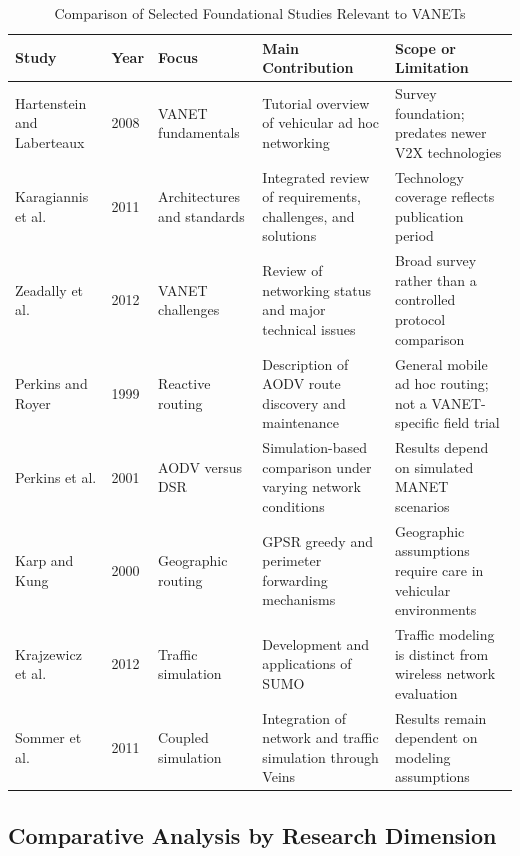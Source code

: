 \begin{table}[t]
\centering
\caption{Comparison of Selected Foundational Studies Relevant to VANETs}
\label{tab:research_comparison}
\scriptsize
\begin{tabular}{|p{2.7cm}|p{1.1cm}|p{2.8cm}|p{4.0cm}|p{4.4cm}|}
\hline
\textbf{Study} &
\textbf{Year} &
\textbf{Focus} &
\textbf{Main Contribution} &
\textbf{Scope or Limitation} \\
\hline
Hartenstein and Laberteaux
\cite{Hartenstein2008} &
2008 &
VANET fundamentals &
Tutorial overview of vehicular ad hoc networking &
Survey foundation; predates newer V2X technologies \\
\hline
Karagiannis et al.
\cite{Karagiannis2011} &
2011 &
Architectures and standards &
Integrated review of requirements, challenges, and solutions &
Technology coverage reflects publication period \\
\hline
Zeadally et al.
\cite{Zeadally2012} &
2012 &
VANET challenges &
Review of networking status and major technical issues &
Broad survey rather than a controlled protocol comparison \\
\hline
Perkins and Royer
\cite{Perkins1999} &
1999 &
Reactive routing &
Description of AODV route discovery and maintenance &
General mobile ad hoc routing; not a VANET-specific field trial \\
\hline
Perkins et al.
\cite{Perkins2001} &
2001 &
AODV versus DSR &
Simulation-based comparison under varying network conditions &
Results depend on simulated MANET scenarios \\
\hline
Karp and Kung
\cite{Karp2000} &
2000 &
Geographic routing &
GPSR greedy and perimeter forwarding mechanisms &
Geographic assumptions require care in vehicular environments \\
\hline
Krajzewicz et al.
\cite{Krajzewicz2012} &
2012 &
Traffic simulation &
Development and applications of SUMO &
Traffic modeling is distinct from wireless network evaluation \\
\hline
Sommer et al.
\cite{Sommer2011} &
2011 &
Coupled simulation &
Integration of network and traffic simulation through Veins &
Results remain dependent on modeling assumptions \\
\hline
\end{tabular}
\end{table}

\subsection{Comparative Analysis by Research Dimension}

